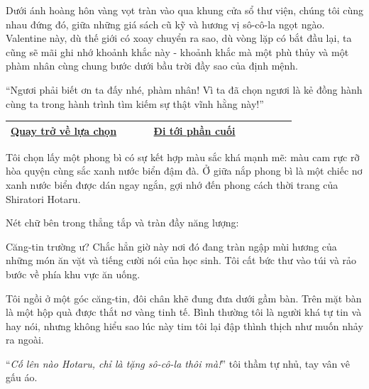 \documentclass[../main.tex]{subfiles}
\begin{document}
Dưới ánh hoàng hôn vàng vọt tràn vào qua khung cửa sổ thư viện, chúng tôi cùng nhau đứng đó, giữa những giá sách cũ kỹ và hương vị sô-cô-la ngọt ngào. Valentine này, dù thế giới có xoay chuyển ra sao, dù vòng lặp có bắt đầu lại, ta cũng sẽ mãi ghi nhớ khoảnh khắc này - khoảnh khắc mà một phù thủy và một phàm nhân cùng chung bước dưới bầu trời đầy sao của định mệnh.

``Ngươi phải biết ơn ta đấy nhé, phàm nhân! Vì ta đã chọn ngươi là kẻ đồng hành cùng ta trong hành trình tìm kiếm sự thật vĩnh hằng này!''

\begin{table}[H]
  \centering
  \setlength{\arrayrulewidth}{1pt}
  \begin{tabular}{|>{\centering\arraybackslash}p{0.4\linewidth}|>{\centering\arraybackslash}p{0.4\linewidth}|}
    \hline
    \hyperref[choice]{Quay trở về lựa chọn} & \hyperref[ending]{Đi tới phần cuối} \\ \hline
  \end{tabular}
\end{table}

\newpage
\label{hotaru}

Tôi chọn lấy một phong bì có sự kết hợp màu sắc khá mạnh mẽ: màu cam rực rỡ hòa quyện cùng sắc xanh nước biển đậm đà. Ở giữa nắp phong bì là một chiếc nơ xanh nước biển được dán ngay ngắn, gợi nhớ đến phong cách thời trang của Shiratori Hotaru.

Nét chữ bên trong thẳng tắp và tràn đầy năng lượng:


Căng-tin trường ư? Chắc hẳn giờ này nơi đó đang tràn ngập mùi hương của những món ăn vặt và tiếng cười nói của học sinh. Tôi cất bức thư vào túi và rảo bước về phía khu vực ăn uống.

\ct


Tôi ngồi ở một góc căng-tin, đôi chân khẽ đung đưa dưới gầm bàn. Trên mặt bàn là một hộp quà được thắt nơ vàng tinh tế. Bình thường tôi là người khá tự tin và hay nói, nhưng không hiểu sao lúc này tim tôi lại đập thình thịch như muốn nhảy ra ngoài.

``\textit{Cố lên nào Hotaru, chỉ là tặng sô-cô-la thôi mà!}'' tôi thầm tự nhủ, tay vân vê gấu áo.
\end{document}
